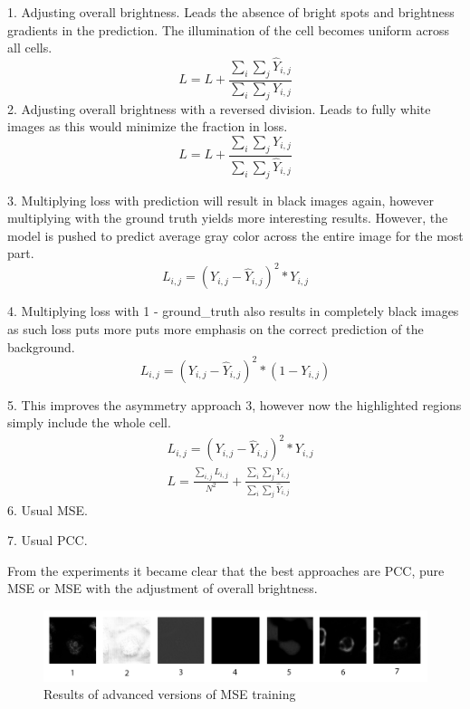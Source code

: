 1. Adjusting overall brightness. Leads the absence of bright spots and brightness gradients in the prediction. The illumination of the cell becomes uniform across all cells.
\begin{equation}
	L = L + \frac{\sum\limits_i\sum\limits_j \hat{Y}_{i, j}}{\sum\limits_i\sum\limits_j Y_{i, j}}
\end{equation}
2. Adjusting overall brightness with a reversed division. Leads to fully white images as this would minimize the fraction in loss.
\begin{equation}
	L = L + \frac{\sum\limits_i\sum\limits_j Y_{i, j}}{\sum\limits_i\sum\limits_j \hat{Y}_{i, j}}
\end{equation}

3. Multiplying loss with prediction will result in black images again, however multiplying with the ground truth yields more interesting results. However, the model is pushed to predict average gray color across the entire image for the most part.
\begin{equation}
	L_{i, j} = \left(Y_{i, j} - \hat{Y}_{i, j}\right)^2 * Y_{i, j}
\end{equation}

4. Multiplying loss with 1 - ground\_truth also results in completely black images as such loss puts more puts more emphasis on the correct prediction of the background.
\begin{equation}
	L_{i, j} = \left(Y_{i, j} - \hat{Y}_{i, j}\right)^2  * \left(1 - Y_{i, j}\right)
\end{equation}

5. This improves the asymmetry approach 3, however now the highlighted regions simply include the whole cell.
\begin{align}
	&L_{i, j} = \left(Y_{i, j} - \hat{Y}_{i, j}\right)^2 * Y_{i, j} \\
	&L = \frac{\sum\limits_{i, j}{L_{i, j} }}{N^2} +  \frac{\sum\limits_i\sum\limits_j Y_{i, j}}{\sum\limits_i\sum\limits_j \hat{Y}_{i, j}}
\end{align}
6. Usual MSE.

7. Usual PCC.

From the experiments it became clear that the best approaches are PCC, pure MSE or MSE with the adjustment of overall brightness.

\begin{figure}[H]
	\begin{center}
		\includegraphics[width=\linewidth]{bilder/golgi/asymmetrical-predictions.png}
		\caption{Results of advanced versions of MSE training}\label{fig:golgi-asymmetrical-predictions}
	\end{center}
\end{figure} 